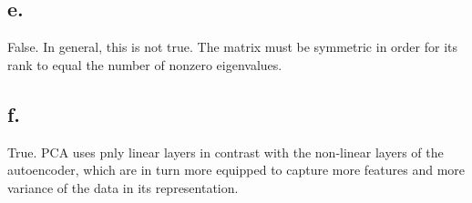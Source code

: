 \documentclass{article}
\newcommand{\1}{\mathbf{1}}
\begin{document}
{\subsection*{e.}

False. In general, this is not true. The matrix must be symmetric in order for its rank to equal the number of nonzero eigenvalues.

\subsection*{f.}

True. PCA uses pnly linear layers in contrast with the non-linear layers of the autoencoder, which are in turn more equipped to capture more features and more variance of the data in its representation.

}
\end{document}
